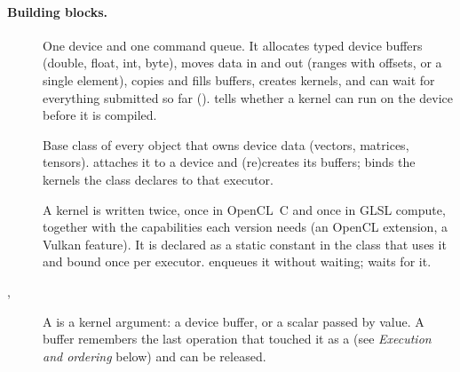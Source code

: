 \documentclass[main.tex]{subfiles}
\begin{document}
    \paragraph{Building blocks.}
    \begin{description}
        \item[] One device and one command queue. It allocates typed device buffers (double, float, int, byte), moves data in and out (ranges with offsets, or a single element), copies and fills buffers, creates kernels, and can wait for everything submitted so far ().  tells whether a kernel can run on the device before it is compiled.
        \item[] Base class of every object that owns device data (vectors, matrices, tensors).  attaches it to a device and (re)creates its buffers;  binds the kernels the class declares to that executor.
        \item[] A kernel is written twice, once in OpenCL~C and once in GLSL compute, together with the capabilities each version needs (an OpenCL extension, a Vulkan feature). It is declared as a static constant in the class that uses it and bound once per executor.  enqueues it without waiting;  waits for it.
        \item[, ] A  is a kernel argument: a device buffer, or a scalar passed by value. A buffer remembers the last operation that touched it as a  (see \emph{Execution and ordering} below) and can be released.
    \end{description}
\end{document}
